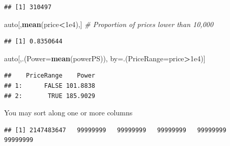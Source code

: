 \documentclass[]{book}
\newenvironment{Shaded}{\begin{snugshade}}{\end{snugshade}}
\newcommand{\KeywordTok}[1]{\textcolor[rgb]{0.13,0.29,0.53}{\textbf{#1}}}
\newcommand{\DataTypeTok}[1]{\textcolor[rgb]{0.13,0.29,0.53}{#1}}
\newcommand{\FloatTok}[1]{\textcolor[rgb]{0.00,0.00,0.81}{#1}}
\newcommand{\StringTok}[1]{\textcolor[rgb]{0.31,0.60,0.02}{#1}}
\newcommand{\CommentTok}[1]{\textcolor[rgb]{0.56,0.35,0.01}{\textit{#1}}}
\newcommand{\OperatorTok}[1]{\textcolor[rgb]{0.81,0.36,0.00}{\textbf{#1}}}
\newcommand{\NormalTok}[1]{#1}
\theoremstyle{definition}
\theoremstyle{definition}
\theoremstyle{definition}
\theoremstyle{remark}
\begin{document}
\begin{verbatim}
## [1] 310497
\end{verbatim}

\begin{Shaded}
\begin{Highlighting}[]
\NormalTok{auto[,}\KeywordTok{mean}\NormalTok{(price}\OperatorTok{<}\FloatTok{1e4}\NormalTok{),] }\CommentTok{# Proportion of prices lower than 10,000}
\end{Highlighting}
\end{Shaded}

\begin{verbatim}
## [1] 0.8350644
\end{verbatim}

\begin{Shaded}
\begin{Highlighting}[]
\NormalTok{auto[,.(}\DataTypeTok{Power=}\KeywordTok{mean}\NormalTok{(powerPS)), by=.(}\DataTypeTok{PriceRange=}\NormalTok{price}\OperatorTok{>}\FloatTok{1e4}\NormalTok{)] }
\end{Highlighting}
\end{Shaded}

\begin{verbatim}
##    PriceRange    Power
## 1:      FALSE 101.8838
## 2:       TRUE 185.9029
\end{verbatim}

You may sort along one or more columns

\begin{Shaded}
\end{Shaded}

\begin{verbatim}
## [1] 2147483647   99999999   99999999   99999999   99999999   99999999
\end{verbatim}

\begin{Shaded}
\end{Shaded}
\end{document}
